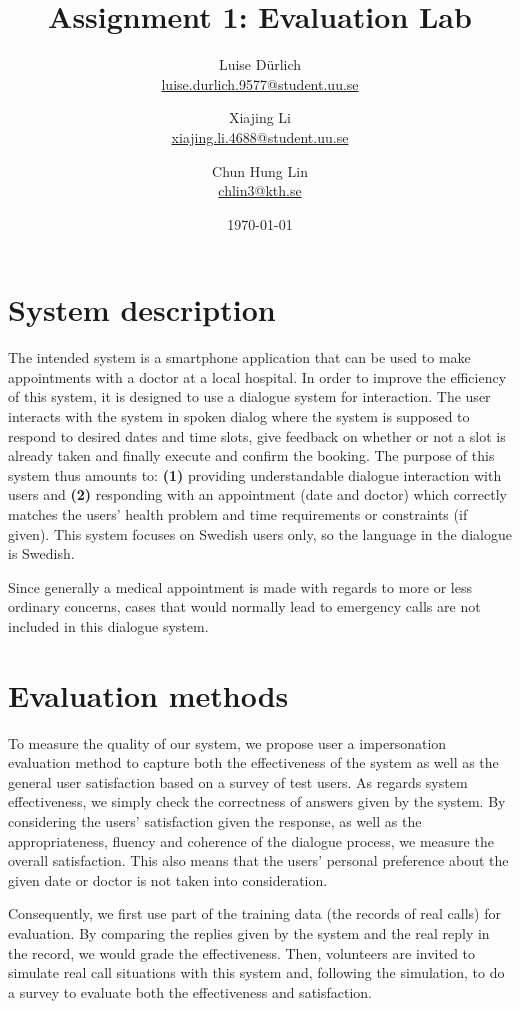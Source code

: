 \documentclass{article}
\title{Assignment 1: Evaluation Lab}
\author{
    Luise Dürlich\\
    \href{mailto:luise.durlich.9577@student.uu.se}{luise.durlich.9577@student.uu.se}
    \and
    Xiajing Li\\
    \href{mailto:xiajing.li.4688@student.uu.se}{xiajing.li.4688@student.uu.se}
    \and
    Chun Hung Lin\\
    \href{mailto:chlin3@kth.se}{chlin3@kth.se}
}
\date{\today}
\begin{document}
\maketitle

\section{System description}
The intended system is a smartphone application that can be used to make appointments with a doctor at a local hospital. In order to improve the efficiency of this system, it is designed to use a dialogue system for interaction. The user interacts with the system in spoken dialog where the system is supposed to respond to desired dates and time slots, give feedback on whether or not a slot is already taken and finally execute and confirm the booking. The purpose of this system thus amounts to: \textbf{(1)} providing understandable dialogue interaction with users and \textbf{(2)} responding with an appointment (date and doctor) which correctly matches the users' health problem and time requirements or constraints (if given). This system focuses on Swedish users only, so the language in the dialogue is Swedish.
\vspace{0.5cm}

\noindent Since generally a medical appointment is made with regards to more or less ordinary concerns, cases that would normally lead to emergency calls are not included in this dialogue system.

\section{Evaluation methods}
To measure the quality of our system, we propose user a impersonation evaluation method to capture both the effectiveness of the system as well as the general user satisfaction based on a survey of test users. As regards system effectiveness, we simply check the correctness of answers given by the system. By considering the users' satisfaction given the response, as well as the appropriateness, fluency and coherence of the dialogue process, we measure the overall satisfaction. This also means that the users' personal preference about the given date or doctor is not taken into consideration.
\vspace{0.5cm}

\noindent Consequently, we first use part of the training data (the records of real calls) for evaluation. By comparing the replies given by the system and the real reply in the record, we would grade the effectiveness. Then, volunteers are invited to simulate real call situations with this system and, following the simulation, to do a survey to evaluate both the effectiveness and satisfaction.
\end{document}
